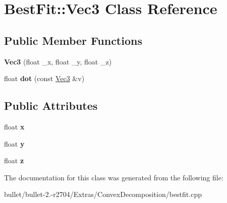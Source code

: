 \hypertarget{class_best_fit_1_1_vec3}{\section{Best\+Fit\+:\+:Vec3 Class Reference}
\label{class_best_fit_1_1_vec3}
}
\subsection*{Public Member Functions}
\begin{DoxyCompactItemize}
\item 
\hypertarget{class_best_fit_1_1_vec3_acc5482f2ff907fe1b515e4948b1bd498}{{\bfseries Vec3} (float \+\_\+x, float \+\_\+y, float \+\_\+z)}\label{class_best_fit_1_1_vec3_acc5482f2ff907fe1b515e4948b1bd498}

\item 
\hypertarget{class_best_fit_1_1_vec3_a26cb9799038e26b3283ac5e7a0c588a4}{float {\bfseries dot} (const \hyperlink{class_best_fit_1_1_vec3}{Vec3} \&v)}\label{class_best_fit_1_1_vec3_a26cb9799038e26b3283ac5e7a0c588a4}

\end{DoxyCompactItemize}
\subsection*{Public Attributes}
\begin{DoxyCompactItemize}
\item 
\hypertarget{class_best_fit_1_1_vec3_a971fca6889350f449145717c435e1ee2}{float {\bfseries x}}\label{class_best_fit_1_1_vec3_a971fca6889350f449145717c435e1ee2}

\item 
\hypertarget{class_best_fit_1_1_vec3_a5e782c4ee918105fa5bbf1c304457b46}{float {\bfseries y}}\label{class_best_fit_1_1_vec3_a5e782c4ee918105fa5bbf1c304457b46}

\item 
\hypertarget{class_best_fit_1_1_vec3_adeacb540014039ef1e11687563ed71e6}{float {\bfseries z}}\label{class_best_fit_1_1_vec3_adeacb540014039ef1e11687563ed71e6}

\end{DoxyCompactItemize}


The documentation for this class was generated from the following file\+:\begin{DoxyCompactItemize}
\item 
bullet/bullet-\/2.-\/r2704/\+Extras/\+Convex\+Decomposition/bestfit.\+cpp\end{DoxyCompactItemize}
